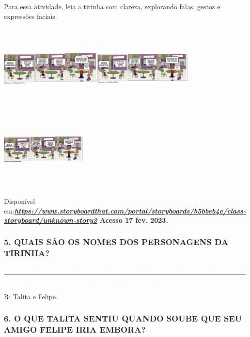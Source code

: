 Para essa atividade, leia a tirinha com clareza, explorando falas, gestos e expressões faciais.

\includegraphics[width=2.02083in,height=1.75347in]{media/image173.png}\includegraphics[width=1.93472in,height=1.75347in]{media/image174.png}\includegraphics[width=1.70069in,height=1.64028in]{media/image175.png}

Disponível
em:\textbf{\href{https://www.storyboardthat.com/portal/storyboards/b5bbeb4e/class-storyboard/unknown-story3}{\emph{https://www.storyboardthat.com/portal/storyboards/b5bbeb4e/class-storyboard/unknown-story3}}
Acesso 17 fev. 2023.}

\subsubsection{5. QUAIS SÃO OS NOMES DOS PERSONAGENS DA
TIRINHA?}\label{quais-suxe3o-os-nome-dos-personagens-da-tirinha}

\textbf{\_\_\_\_\_\_\_\_\_\_\_\_\_\_\_\_\_\_\_\_\_\_\_\_\_\_\_\_\_\_\_\_\_\_\_\_\_\_\_\_\_\_\_\_\_\_\_\_\_\_\_\_\_\_\_\_\_\_\_\_\_\_\_\_\_\_}

R: Talita e Felipe.

\subsubsection{6. O QUE TALITA SENTIU QUANDO SOUBE QUE SEU AMIGO
FELIPE IRIA EMBORA?}\label{como-talita-ficou-quando-ficou-sabendo-que-seu-amigo-felipe-ia-embora}

